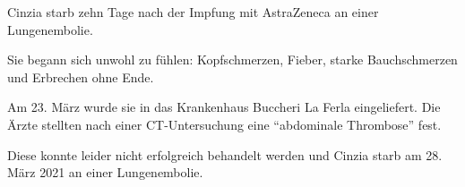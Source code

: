 Cinzia starb zehn Tage nach der Impfung mit AstraZeneca an einer Lungenembolie.

Sie begann sich unwohl zu fühlen: Kopfschmerzen, Fieber, starke Bauchschmerzen
und Erbrechen ohne Ende.

Am 23. März wurde sie in das Krankenhaus Buccheri La Ferla eingeliefert. Die
Ärzte stellten nach einer CT-Untersuchung eine ``abdominale Thrombose'' fest.

Diese konnte leider nicht erfolgreich behandelt werden und Cinzia starb am
28. März 2021 an einer Lungenembolie.
